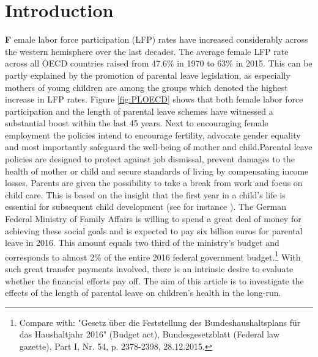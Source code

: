 \documentclass[a4paper ]{article}
\begin{document}




\newpage

\section{Introduction}
\lettrine[lines=2]{\color{gray}\textbf{F}}{ }emale labor force participation (LFP) rates have increased considerably across the western hemisphere over the last decades. The average female LFP rate across all OECD countries raised from 47.6\% in 1970 to 63\% in 2015. This can be partly explained by the promotion of parental leave legislation, as especially mothers of young children are among the groups which denoted the highest increase in LFP rates. Figure \ref{fig:PLOECD} shows that both female labor force participation and the length of parental leave schemes have witnessed a substantial boost within the last 45 years. Next to encouraging female employment the policies intend to encourage fertility, advocate gender equality and most importantly safeguard the well-being of mother and child.\newline Parental leave policies are designed to protect against job dismissal, prevent damages to the health of mother or child and secure standards of living by compensating income losses. Parents are given the possibility to take a break from work and focus on child care. This is based on the insight that the first year in a child's life is essential for subsequent child development (see for instance \cite{flavell1993cognitive}). \newline The German Federal Ministry of Family Affairs is willing to spend a great deal of money for achieving these social goals and is expected to pay six billion euros for parental leave in 2016. This amount equals two third of the ministry's budget and corresponds to almost 2\% of the entire 2016 federal government budget.\footnote{Compare with: "Gesetz über die Feststellung des Bundeshaushaltsplans für das Haushaltjahr 2016" (Budget act), Bundesgesetzblatt (Federal law gazette), Part I, Nr. 54, p. 2378-2398, 28.12.2015.} With such great transfer payments involved, there is an intrinsic desire to evaluate whether the financial efforts pay off. The aim of this article is to investigate the effects of the length of parental leave on children's health in the long-run. \newline
\end{document}
